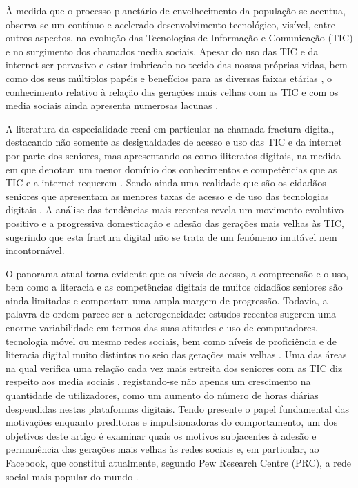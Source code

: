 \documentclass[portuguese]{textolivre}
\begin{document}
À medida que o processo planetário de envelhecimento da população se acentua, observa-se um contínuo e acelerado desenvolvimento tecnológico, visível, entre outros aspectos, na evolução das Tecnologias de Informação e Comunicação (TIC) e no surgimento dos chamados media sociais. Apesar do uso das TIC e da internet ser pervasivo e estar imbricado no tecido das nossas próprias vidas, bem como dos seus múltiplos papéis e benefícios para as diversas faixas etárias \cite{castells2009, barroso2015, gil2016}, o conhecimento relativo à relação das gerações mais velhas com as TIC e com os media sociais ainda apresenta numerosas lacunas \cite{givskov2018}.

A literatura da especialidade recai em particular na chamada fractura digital, destacando não somente as desigualdades de acesso e uso das TIC e da internet por parte dos seniores, mas apresentando-os como iliteratos digitais, na medida em que denotam um menor domínio dos conhecimentos e competências que as TIC e a internet requerem \cite{friemel2016, francis2019}. Sendo ainda uma realidade que são os cidadãos seniores que apresentam as menores taxas de acesso e de uso das tecnologias digitais \cite{eurostat2019, eurostat2020, statista2020}. A análise das tendências mais recentes revela um movimento evolutivo positivo e a progressiva domesticação e adesão das gerações mais velhas às TIC, sugerindo que esta fractura digital não se trata de um fenómeno imutável nem incontornável.

O panorama atual torna evidente que os níveis de acesso, a compreensão e o uso, bem como a literacia e as competências digitais de muitos cidadãos seniores são ainda limitadas e comportam uma ampla margem de progressão. Todavia, a palavra de ordem parece ser a heterogeneidade: estudos recentes sugerem uma enorme variabilidade em termos das suas atitudes e uso de computadores, tecnologia móvel ou mesmo redes sociais, bem como níveis de proficiência e de literacia digital muito distintos no seio das gerações mais velhas \cite{chopik2016, coelho2019, miranda2020, van_boekel2017}. Uma das áreas na qual verifica uma relação cada vez mais estreita dos seniores com as TIC diz respeito aos media sociais \cite{hutto2015, yang2016}, registando-se não apenas um crescimento na quantidade de utilizadores, como um aumento do número de horas diárias despendidas nestas plataformas digitais. Tendo presente o papel fundamental das motivações enquanto preditoras e impulsionadoras do comportamento, um dos objetivos deste artigo é examinar quais os motivos subjacentes à adesão e permanência das gerações mais velhas às redes sociais e, em particular, ao Facebook, que constitui atualmente, segundo Pew Research Centre (PRC), a rede social mais popular do mundo \cite{pew2019}.
\end{document}
